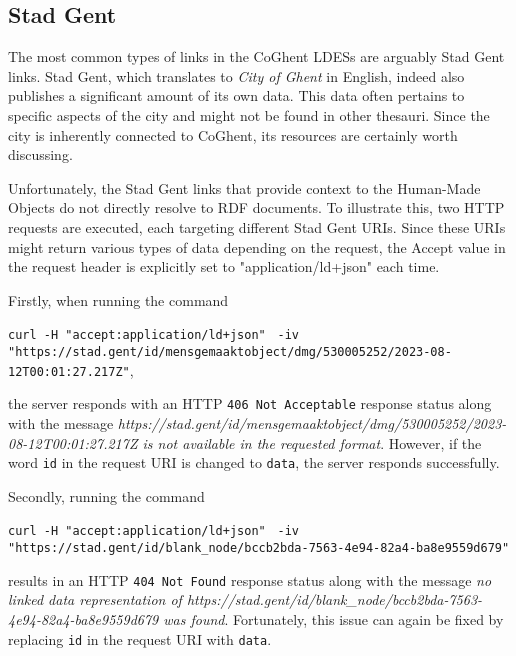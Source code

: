 \subsection{Stad Gent}
\label{subsec:stad_gent}

The most common types of links in the CoGhent LDESs are arguably Stad Gent links. Stad Gent, which translates to \textit{City of Ghent} in English, indeed also publishes a significant amount of its own data. This data often pertains to specific aspects of the city and might not be found in other thesauri. Since the city is inherently connected to CoGhent, its resources are certainly worth discussing.

Unfortunately, the Stad Gent links that provide context to the Human-Made Objects do not directly resolve to RDF documents. To illustrate this, two HTTP requests are executed, each targeting different Stad Gent URIs. Since these URIs might return various types of data depending on the request, the Accept value in the request header is explicitly set to "application/ld+json" each time.

Firstly, when running the command
\begin{flushleft}
    {\small \texttt{curl -H "accept:application/ld+json"}}
    {\small \texttt{     -iv "https://stad.gent/id/mensgemaaktobject/dmg/530005252/2023-08-12T00:01:27.217Z"}},
\end{flushleft}
the server responds with an HTTP \texttt{406 Not Acceptable} response status along with the message \linebreak\textit{https://stad.gent/id/mensgemaaktobject/dmg/530005252/2023-08-12T00:01:27.217Z is not available in the requested format}.
However, if the word \texttt{id} in the request URI is changed to \texttt{data}, the server responds successfully.

Secondly, running the command
\begin{flushleft}
    {\small \texttt{curl -H "accept:application/ld+json"}}
    {\small \texttt{     -iv "https://stad.gent/id/blank_node/bccb2bda-7563-4e94-82a4-ba8e9559d679"}}
\end{flushleft}
results in an HTTP \texttt{404 Not Found} response status along with the message \linebreak\textit{no linked data representation of https://stad.gent/id/blank\_node/bccb2bda-7563-4e94-82a4-ba8e9559d679 was found}. Fortunately, this issue can again be fixed by replacing \texttt{id} in the request URI with \texttt{data}.

